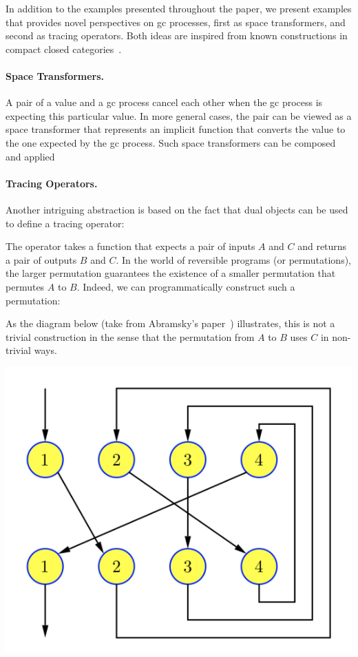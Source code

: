 \documentclass[sigplan,10pt,review,anonymous]{acmart}
\begin{document}
In addition to the examples presented throughout the paper, we present
examples that provides novel perspectives on gc processes, first as
space transformers, and second as tracing operators. Both ideas are
inspired from known constructions in compact closed
categories~\cite{DBLP:conf/calco/Abramsky05}.

\paragraph*{Space Transformers.} A pair of a value and a gc process
cancel each other when the gc process is expecting this particular
value. In more general cases, the pair can be viewed as a space
transformer that represents an implicit function that converts the value to the
one expected by the gc process. Such space transformers can be
composed and applied

\PPFThof{}

\paragraph*{Tracing Operators.} Another intriguing abstraction is
based on the fact that dual objects can be used to define a tracing
operator:

\PPFTtrace{}

The operator takes a function that expects a pair of inputs $A$ and
$C$ and returns a pair of outputs $B$ and $C$. In the world of
reversible programs (or permutations), the larger permutation
guarantees the existence of a smaller permutation that permutes $A$ to
$B$. Indeed, we can programmatically construct such a permutation:

As the diagram below (take from Abramsky's
paper~\cite{DBLP:conf/calco/Abramsky05}) illustrates, this is not a
trivial construction in the sense that the permutation from $A$ to $B$
uses $C$ in non-trivial ways. 

\includegraphics[scale=0.5]{trace.png}
\end{document}

